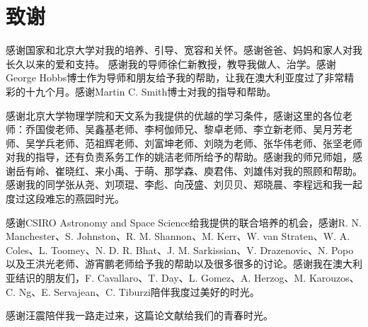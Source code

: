 
\chapter{致谢}

感谢国家和北京大学对我的培养、引导、宽容和关怀。感谢爸爸、妈妈和家人对我长久以来的爱和支持。
感谢我的导师徐仁新教授，教导我做人、治学。感谢George Hobbs博士作为导师和朋友给予我的帮助，让我在澳大利亚度过了非常精彩的十九个月。感谢Martin C. Smith博士对我的指导和帮助。

感谢北京大学物理学院和天文系为我提供的优越的学习条件，感谢这里的各位老师：乔国俊老师、吴鑫基老师、李柯伽师兄、黎卓老师、李立新老师、吴月芳老师、吴学兵老师、范祖辉老师、刘富坤老师、刘晓为老师、张华伟老师、张坚老师对我的指导，还有负责系务工作的姚洁老师所给予的帮助。感谢我的师兄师姐，感谢岳有岭、崔晓红、来小禹、于萌、那学森、庾君伟、刘雄伟对我的照顾和帮助。感谢我的同学张从尧、刘项琨、李彪、向茂盛、刘贝贝、郑晓晨、李程远和我一起度过这段难忘的燕园时光。

感谢CSIRO Astronomy and Space Science给我提供的联合培养的机会，感谢R. N. Manchester、S. Johnston、R. M. Shannon、M. Kerr、W. van Straten、W. A. Coles、L. Toomey、N. D. R. Bhat、J. M. Sarkissian、V. Drazenovic、N. Popo以及王洪光老师、游宵鹏老师给予我的帮助以及很多很多的讨论。感谢我在澳大利亚结识的朋友们，F. Cavallaro、T. Day、L. Gomez、A. Herzog、M. Karouzos、C. Ng、E. Servajean、C. Tiburzi陪伴我度过美好的时光。

感谢汪震陪伴我一路走过来，这篇论文献给我们的青春时光。
\pkuthssffaq

